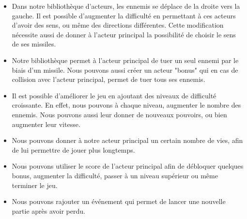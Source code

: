 \documentclass[a4paper,10pt]{article}
\begin{document}
\begin{itemize}
    \item Dans notre bibliothèque d'acteurs, les ennemis se déplace de la droite vers la gauche. Il est possible d'augmenter la difficulté en permettant à ces acteurs d'avoir des sens, ou même des directions différentes. Cette modification nécessite aussi de donner à l'acteur principal la possibilité de choisir le sens de ses missiles. \\
    
    
    \item Notre bibliothèque permet à l'acteur principal de tuer un seul ennemi par le biais d'un missile. Nous pouvons aussi créer un acteur "bonus" qui en cas de collision avec l'acteur principal, permet de tuer tous ses ennemis.\\
    
    \item Il est possible d'améliorer le jeu en ajoutant des niveaux de difficulté croissante. En effet, nous pouvons à chaque niveau, augmenter le nombre des ennemis. Nous pouvons aussi leur donner de nouveaux pouvoirs, ou bien augmenter leur vitesse.\\
    
    \item Nous pouvons donner à notre acteur principal un certain nombre de vies, afin de lui permettre de jouer plus longtemps.\\
    
    \item Nous pouvons utiliser le score de l'acteur principal afin de débloquer quelques bonus, augmenter la difficulté, passer à un niveau supérieur ou même terminer le jeu.\\
    
    
    \item Nous pouvons rajouter un événement qui permet de lancer une nouvelle partie après avoir perdu.\\
    
    
\end{itemize}
\end{document}
